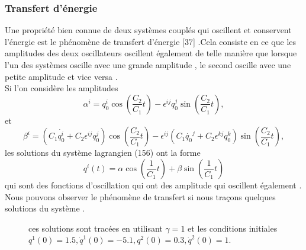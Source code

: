 \documentclass[12pt,a4paper, openany]{article}
\begin{document}
		 	\subsubsection{Transfert d'énergie}
		 	Une propriété bien connue de deux systèmes couplés qui oscillent et conservent l'énergie est le phénomène de transfert d'énergie [37] .Cela consiste en ce que les amplitudes des deux oscillateurs oscillent également de telle manière que lorsque l'un des systèmes oscille avec une grande amplitude , le second oscille avec une petite amplitude et vice versa .\\
		 	Si l'on considère les amplitudes 
		 	\begin{equation}
		 	\alpha^i=q_0^i\cos\left(\frac{C_2}{C_1}t\right)-\epsilon^{ij}q_0^j\sin\left(\frac{C_2}{C_1}t\right) ,	
		 	\end{equation}
		 	et 
		 	\begin{equation}
		 		\beta^i=\left(C_1\dot{q^i_0}+C_2\epsilon^{ij}q^j_0\right)\cos\left(\frac{C_2}{C_1}t\right)-\epsilon^{ij}\left(C_1\dot{q_0}^j+C_2\epsilon^{kj}q^k_0\right)\sin\left(\frac{C_2}{C_1}t\right),
		 	\end{equation}
		 	les solutions du système lagrangien (156) ont la forme 
		 	\begin{equation}
		 	q^i(t)=\alpha\cos\left(\frac{1}{C_1}t\right)+\beta\sin\left(\frac{1}{C_1}t\right)
		 	\end{equation}
		 	qui sont des fonctions d'oscillation qui ont des amplitude qui oscillent également .\\
		 	Nous pouvons observer le phénomène de transfert si nous traçons quelques solutions du système .
		 	\begin{figure}[h]
		 		\centering
		 		\caption{ces solutions sont tracées en utilisant $\gamma =1$ et les conditions initiales $q^1(0)=1.5 ,\dot{q}^1(0)=-5.1 ,q^2(0)=0.3 ,\dot{q}^2(0)=1$.}
		 		\label{fig:hannay}
		 	\end{figure}
		 	
		 
		 	
		 	
		 	
\end{document}
